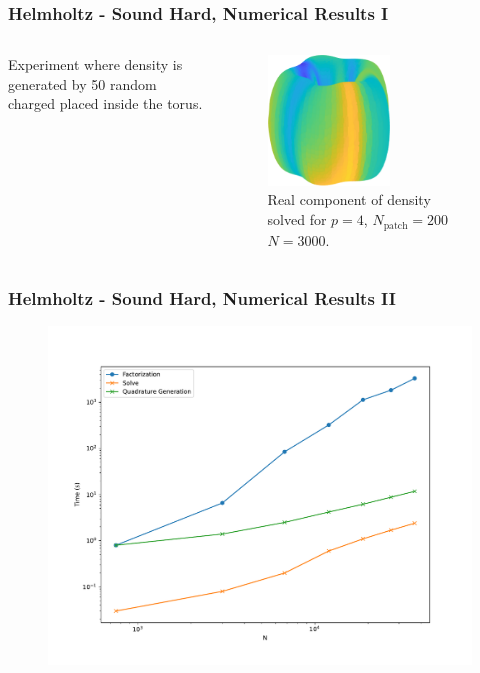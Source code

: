 \begin{frame}

    \frametitle{Helmholtz - Sound Hard, Numerical Results I}

    \begin{columns}
        \begin{column}{0.5\textwidth}
            Experiment where density is generated by 50 random charged placed inside the torus.
        \end{column}
        \begin{column}{0.5\textwidth}
            \begin{figure}
                \includegraphics[width=0.6\textwidth]{assets/wiggly_torus_solved.pdf}
            \caption{Real component of density solved for $p=4$, $N_{\text{patch}} = 200$
                $N = 3000$.
            }
            \end{figure}
        \end{column}
    \end{columns}

\end{frame}

\begin{frame}
    \frametitle{Helmholtz - Sound Hard, Numerical Results II}

    \begin{figure}
        \includegraphics[width=\textwidth]{assets/scaling.pdf}
    \end{figure}
\end{frame}

